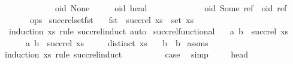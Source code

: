 \begin{isabellebody}
\ \ \ \ \ \ \ \ \ \ \ \ {\isacharparenleft}oid{\isacharcomma}\ None{\isacharparenright}\ \ \ \ \ {\isasymRightarrow}\ {\isacharparenleft}oid{\isacharcomma}\ head{\isacharparenright}\ {\isacharbar}\isanewline
\ \ \ \ \ \ \ \ \ \ \ \ {\isacharparenleft}oid{\isacharcomma}\ Some\ ref{\isacharparenright}\ {\isasymRightarrow}\ {\isacharparenleft}oid{\isacharcomma}\ ref{\isacharparenright}{\isacharparenright}\ \isanewline
\ \ \ \ \ \ ops{\isacharparenright}{\isachardoublequoteclose}\isanewline
\isanewline
{}\isamarkupfalse%
\ succ{\isacharunderscore}rel{\isacharunderscore}set{\isacharunderscore}fst{\isacharcolon}\isanewline
\ \ \ {\isachardoublequoteopen}fst\ {\isacharbackquote}\ {\isacharparenleft}succ{\isacharunderscore}rel\ xs{\isacharparenright}\ {\isacharequal}\ set\ xs{\isachardoublequoteclose}\isanewline
%
\isadelimproof
%
\endisadelimproof
%
\isatagproof
{}\isamarkupfalse%
\ {\isacharparenleft}induction\ xs\ rule{\isacharcolon}\ succ{\isacharunderscore}rel{\isachardot}induct{\isacharcomma}\ auto{\isacharparenright}%
\endisatagproof
{\isafoldproof}%
%
\isadelimproof
\isanewline
%
\endisadelimproof
\isanewline
{}\isamarkupfalse%
\ succ{\isacharunderscore}rel{\isacharunderscore}functional{\isacharcolon}\isanewline
\ \ \ {\isachardoublequoteopen}{\isacharparenleft}a{\isacharcomma}\ b{}{\isacharparenright}\ {\isasymin}\ succ{\isacharunderscore}rel\ xs{\isachardoublequoteclose}\isanewline
\ \ \ \ \ {\isachardoublequoteopen}{\isacharparenleft}a{\isacharcomma}\ b{}{\isacharparenright}\ {\isasymin}\ succ{\isacharunderscore}rel\ xs{\isachardoublequoteclose}\isanewline
\ \ \ \ \ {\isachardoublequoteopen}distinct\ xs{\isachardoublequoteclose}\isanewline
\ \ \ {\isachardoublequoteopen}b{}\ {\isacharequal}\ b{}{\isachardoublequoteclose}\isanewline
%
\isadelimproof
%
\endisadelimproof
%
\isatagproof
{}\isamarkupfalse%
\ assms\ \isamarkupfalse%
{\isacharparenleft}induction\ xs\ rule{\isacharcolon}\ succ{\isacharunderscore}rel{\isachardot}induct{\isacharparenright}\isanewline
\ \ \isamarkupfalse%
\ {}\isanewline
\ \ \isamarkupfalse%
\ \isamarkupfalse%
\ {\isacharquery}case\ \isamarkupfalse%
\ simp\isanewline
{}\isamarkupfalse%
\isanewline
\ \ \isamarkupfalse%
\ {\isacharparenleft}{}\ head{\isacharparenright}\isanewline
\ \ \isamarkupfalse%

\end{isabellebody}
